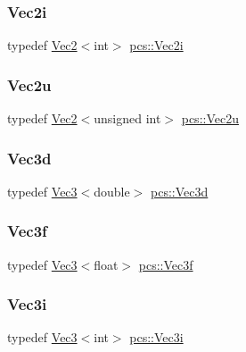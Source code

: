 \mbox{\label{namespacepcs_af322f6d2ecaff325ab1ab8d243e1bc02}} 
\subsubsection{\texorpdfstring{Vec2i}{Vec2i}}
{\footnotesize\ttfamily typedef \hyperlink{structpcs_1_1Vec2}{Vec2}$<$int$>$ \hyperlink{namespacepcs_af322f6d2ecaff325ab1ab8d243e1bc02}{pcs\+::\+Vec2i}}

\mbox{\label{namespacepcs_a3765be05787916d050ad7203dd4a9064}} 
\subsubsection{\texorpdfstring{Vec2u}{Vec2u}}
{\footnotesize\ttfamily typedef \hyperlink{structpcs_1_1Vec2}{Vec2}$<$unsigned int$>$ \hyperlink{namespacepcs_a3765be05787916d050ad7203dd4a9064}{pcs\+::\+Vec2u}}

\mbox{\label{namespacepcs_ad162884a2f34ac8048b26b5393a41981}} 
\subsubsection{\texorpdfstring{Vec3d}{Vec3d}}
{\footnotesize\ttfamily typedef \hyperlink{structpcs_1_1Vec3}{Vec3}$<$double$>$ \hyperlink{namespacepcs_ad162884a2f34ac8048b26b5393a41981}{pcs\+::\+Vec3d}}

\mbox{\label{namespacepcs_a68e0f517680976c17c810ffe6952cbab}} 
\subsubsection{\texorpdfstring{Vec3f}{Vec3f}}
{\footnotesize\ttfamily typedef \hyperlink{structpcs_1_1Vec3}{Vec3}$<$float$>$ \hyperlink{namespacepcs_a68e0f517680976c17c810ffe6952cbab}{pcs\+::\+Vec3f}}

\mbox{\label{namespacepcs_a90c0b9d4184dcb79e95ac2ce79287614}} 
\subsubsection{\texorpdfstring{Vec3i}{Vec3i}}
{\footnotesize\ttfamily typedef \hyperlink{structpcs_1_1Vec3}{Vec3}$<$int$>$ \hyperlink{namespacepcs_a90c0b9d4184dcb79e95ac2ce79287614}{pcs\+::\+Vec3i}}

